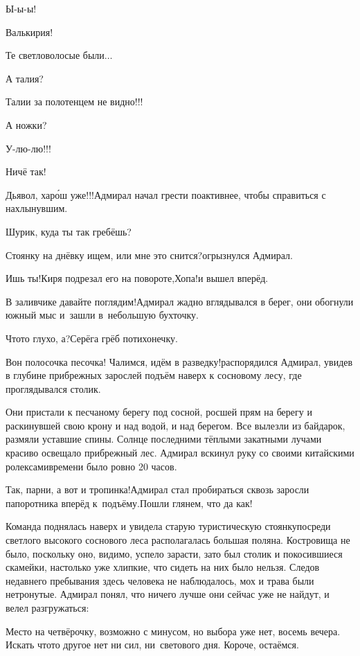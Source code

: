 \diagdash Ы-ы-ы!

\diagdash Валькирия!

\diagdash Те светловолосые были$\ldots$

\diagdash А талия?

\diagdash Талии за полотенцем не видно!!!

\diagdash А ножки?

\diagdash У-лю-лю!!!

\diagdash Ничё так!

\diagdash Дьявол, хар{\'о}ш уже!!!\mdash Адмирал начал грести по\sdash активнее, чтобы справиться с нахлынувшим.

\diagdash Шурик, куда ты так гребёшь?

\diagdash Стоянку на днёвку ищем, или мне это снится?\mdash огрызнулся Адмирал.

\diagdash Ишь ты!\mdash Киря подрезал его на повороте,\mdash Хопа!\mdash и вышел вперёд.

\diagdash В заливчике давайте поглядим!\mdash Адмирал жадно вглядывался в берег, они обогнули южный мыс и~зашли в~небольшую бухточку.

\diagdash Что\sdash то глухо, а?\mdash Серёга грёб потихонечку.

\diagdash Вон полосочка песочка! Чалимся, идём в разведку!\mdash распорядился Адмирал, увидев в глубине прибрежных зарослей подъём наверх к сосновому лесу, где проглядывался столик.

Они пристали к песчаному берегу под сосной, росшей прям на берегу и раскинувшей свою крону и над водой, и над берегом. Все вылезли из байдарок, размяли уставшие спины. Солнце последними тёплыми закатными лучами красиво освещало прибрежный лес. Адмирал вскинул руку со своими китайскими ролексами\mdash времени было ровно 20 часов.

\diagdash Так, парни, а вот и тропинка!\mdash Адмирал стал пробираться сквозь заросли папоротника вперёд к~подъёму.\mdash Пошли глянем, что да как!

Команда поднялась наверх и увидела старую туристическую стоянку\mdash посреди светлого высокого соснового леса располагалась большая поляна. Костровища не было, поскольку оно, видимо, успело зарасти, зато был столик и покосившиеся скамейки, настолько уже хлипкие, что сидеть на них было нельзя. Следов недавнего пребывания здесь человека не наблюдалось, мох и трава были нетронутые. Адмирал понял, что ничего лучше они сейчас уже не найдут, и велел разгружаться:

\diagdash Место на четвёрочку, возможно с минусом, но выбора уже нет, восемь вечера. Искать что\sdash то другое нет ни сил, ни~светового дня. Короче, остаёмся.

